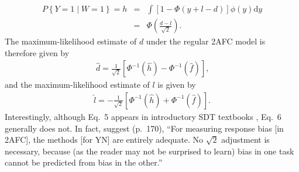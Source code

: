 \documentclass[man]{apa6}
\begin{document}
\begin{eqnarray*}
P\left\{Y=1\mid{}W=1\right\}=h&=&\int\!\left[1-\Phi\left(y+l-d\right)\right]\phi\left(y\right)\textrm{d}y\\
&=&\Phi\left(\frac{d-l}{\sqrt{2}}\right)\textrm{.}
\end{eqnarray*}
The maximum-likelihood estimate of $d$ under the regular 2AFC model is therefore given by
\begin{eqnarray}
\hat{d}=\frac{1}{\sqrt{2}}\left[\Phi^{-1}\left(\hat{h}\right)-\Phi^{-1}\left(\hat{f}\right)\right]\textrm{,}
\label{eq5}
\end{eqnarray} and the maximum-likelihood estimate of $l$ is given by\begin{eqnarray}
\hat{l}=-\frac{1}{\sqrt{2}}\left[\Phi^{-1}\left(\hat{h}\right)+\Phi^{-1}\left(\hat{f}\right)\right]\textrm{.}
\label{eq6}
\end{eqnarray}Interestingly, although Eq.~5 appears in introductory SDT textbooks \parencite[e.g.,][]{Green1966, Macmillan2005}, Eq.~6 generally does not. In fact, \citeauthor{Macmillan2005} suggest (p.~170), ``For measuring response bias [in 2AFC], the methods [for YN] are entirely adequate. No $\sqrt{2}$ adjustment is necessary, because (as the reader may not be surprised to learn) bias in one task cannot be predicted from bias in the other.''
\end{document}
